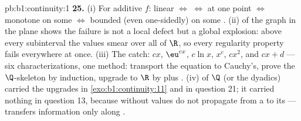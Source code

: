 \begin{solution}{pb:b1:continuity:1}
\textbf{25.} (i) For additive $f$: linear $\iff$ 
$\iff$  at one point $\iff$ monotone on some 
$\iff$ bounded (even one-sidedly) on some . (ii) 
of the graph in the plane shows the failure is not a local
defect but a global explosion: above every subinterval the
values smear over all of $\R$, so every regularity property
fails everywhere at once. (iii) The catch: $cx$, $\eu^{cx}$,
$c\ln x$, $x^c$, $cx^2$, and $cx + d$ --- six characterizations,
one method: transport the equation to Cauchy's, prove the
$\Q$-skeleton by induction, upgrade to $\R$ by  plus
. (iv)  of $\Q$ (or the dyadics) carried the
upgrades in \cref{exo:b1:continuity:11} and in question 21; it
carried nothing in question 13, because without 
values do not propagate from a   to its  ---
 transfers information only along .
\end{solution}
